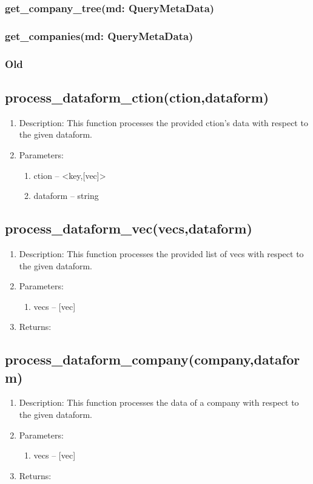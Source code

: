 \documentclass{article}
\begin{document}
\subsubsection{get_company_tree(md: QueryMetaData)}

\subsubsection{get_companies(md: QueryMetaData)}

\subsubsection{Old}

\subsection{process_dataform_ction(ction,dataform)}
\begin{enumerate}
\item Description: This function processes the provided ction's data with respect to the given dataform.
\item Parameters: 
	\begin{enumerate}
		\item ction --  <key,[vec]>
		\item dataform -- string
	\end{enumerate}
\end{enumerate}


\subsection{process_dataform_vec(vecs,dataform)}
\begin{enumerate}
\item Description: This function processes the provided list of vecs with respect to the given dataform.
\item Parameters:
	\begin{enumerate}
		\item vecs -- [vec]
	\end{enumerate}
\item Returns: 
\end{enumerate}


\subsection{process_dataform_company(company,dataform)}
\begin{enumerate}
\item Description: This function processes the data of a company with respect to the given dataform.
\item Parameters:
	\begin{enumerate}
		\item vecs -- [vec]
	\end{enumerate}
\item Returns: 
\end{enumerate}
\end{document}
